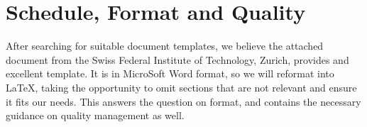 \documentclass{article}
\begin{document}
\begin{comment}
Legible - The code (the code itself, not comments) should clearly state the intent. If the reader can not make sense of the code, than all other efforts are doomed to frustration if not outright failure.

Testable - The code should be organized in a way that facilitates unit testing. That supports all subsequent efforts (refactoring for modification, correction of defects, revision due to changed specs, etc.)

Flexible - Dependencies, both on other code in the code base and arbitrary implementation choices, should be minimized. Hard-coded assumptions about data size, concrete classes or data structures, etc. make the code more brittle, and therefore harder to reuse or adapt.

Compliant - The code should comply with its requirements, functional and otherwise. (I don't state this as "correct" because the discussion about whether the requirements themselves were the "right" requirements is about the process or the environment, not about the code.)

Economical - The code should make reasonable use of system resources: memory, CPU, etc. (I don't state this as "efficient" because that word is too often misused, by limiting it to a single aspect, such as speed. Economy is simply about return on investment, and requires thought about all the resources being invested and all the measures of return.)

The point of insisting that these be considered in order is that each property supports the ones that follow. For example, defects (failure to comply with specs) in code which is legible, testable, and flexible can probably be corrected with reasonable effort. On the other hand, I suspect that every programmer has had experience with code which was micro-optimized for performance to the point that it was too brittle for reasonable maintenance.

\end{comment}


\newpage
\section{Schedule, Format and Quality}
After searching for suitable document templates, we believe the attached document from the Swiss Federal Institute of Technology, Zurich, provides and excellent template. It is in MicroSoft Word format, so we will reformat into LaTeX, taking the opportunity to omit sections that are not relevant and ensure it fits our needs. This answers the question on format, and contains the necessary guidance on quality management as well. 
\end{document}
